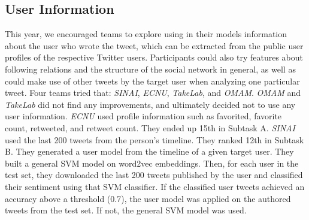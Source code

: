 \documentclass[11pt,a4paper]{article}
\begin{document}


\subsection{User Information}

This year, we encouraged teams to explore using in their models information about the user who wrote the tweet, which can be extracted from the public user profiles of the respective Twitter users.  Participants could also try features about following relations and the structure of the social network in general, as well as could make use of other tweets by the target user when analyzing one particular tweet. Four teams tried that: \emph{SINAI}, \emph{ECNU}, \emph{TakeLab}, and \emph{OMAM}. \emph{OMAM} and \emph{TakeLab} did not find any improvements, and ultimately decided not to use any user information. \emph{ECNU} used profile information such as favorited, favorite count, retweeted, and retweet count. They ended up 15th in Subtask A.
\emph{SINAI} used the last 200 tweets from the person's timeline. They ranked 12th in Subtask B.
They generated a user model from the timeline of a given target user. They built a general SVM model on word2vec embeddings. Then, for each user in the test set, they downloaded the last 200 tweets published by the user and classified their sentiment using that SVM classifier. If the classified user tweets achieved an accuracy above a threshold (0.7), the user model was applied on the authored tweets from the test set. If not, the general SVM model was used. 
\end{document}

